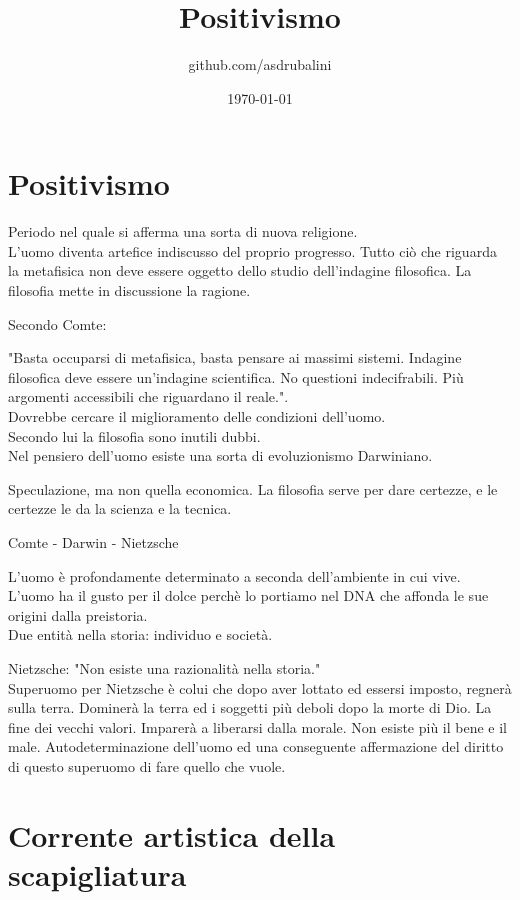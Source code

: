 \documentclass{article}
\title{Positivismo}
\author{github.com/asdrubalini}
\date{\today}
\begin{document}
    \maketitle

    \section{Positivismo}
    Periodo nel quale si afferma una sorta di nuova religione.\\
    L'uomo diventa artefice indiscusso del proprio progresso.
    Tutto ciò che riguarda la metafisica non deve essere oggetto dello studio dell'indagine filosofica. La filosofia mette in discussione la ragione.

    Secondo Comte:
    
    "Basta occuparsi di metafisica, basta pensare ai massimi sistemi. Indagine filosofica deve essere un'indagine scientifica. No questioni indecifrabili. Più argomenti accessibili che riguardano il reale.".\\
    Dovrebbe cercare il miglioramento delle condizioni dell'uomo.\\
    Secondo lui la filosofia sono inutili dubbi.\\
    Nel pensiero dell'uomo esiste una sorta di evoluzionismo Darwiniano.

    Speculazione, ma non quella economica.
    La filosofia serve per dare certezze, e le certezze le da la scienza e la tecnica.

    Comte - Darwin - Nietzsche

    L'uomo è profondamente determinato a seconda dell'ambiente in cui vive.\\
    L'uomo ha il gusto per il dolce perchè lo portiamo nel DNA che affonda le sue origini dalla preistoria.\\
    Due entità nella storia: individuo e società.

    Nietzsche: "Non esiste una razionalità nella storia."\\
    Superuomo per Nietzsche è colui che dopo aver lottato ed essersi imposto, regnerà sulla terra. Dominerà la terra ed i soggetti più deboli dopo la morte di Dio. La fine dei vecchi valori. Imparerà a liberarsi dalla morale. Non esiste più il bene e il male. Autodeterminazione dell'uomo ed una conseguente affermazione del diritto di questo superuomo di fare quello che vuole.

    \section{Corrente artistica della scapigliatura}
\end{document}
